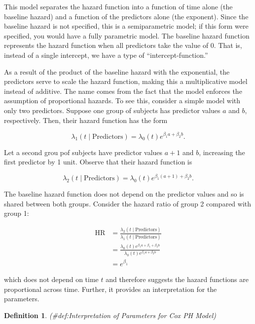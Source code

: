 \documentclass[
]{book}
\theoremstyle{plain}
\theoremstyle{mydefn}
\newtheorem{definition}{Definition}[chapter]
\theoremstyle{myexmpl}
\theoremstyle{remark}
\begin{document}
This model separates the hazard function into a function of time alone (the baseline hazard) and a function of the predictors alone (the exponent). Since the baseline hazard is not specified, this is a semiparametric model; if this form were specified, you would have a fully parametric model. The baseline hazard function represents the hazard function when all predictors take the value of 0. That is, instead of a single intercept, we have a type of ``intercept-function.''

As a result of the product of the baseline hazard with the exponential, the predictors serve to scale the hazard function, making this a multiplicative model instead of additive. The name comes from the fact that the model enforces the assumption of proportional hazards. To see this, consider a simple model with only two predictors. Suppose one group of subjects has predictor values \(a\) and \(b\), respectively. Then, their hazard function has the form

\[\lambda_1(t \mid \text{Predictors}) = \lambda_0(t) e^{\beta_1 a + \beta_2 b}.\]

Let a second grou pof subjects have predictor values \(a + 1\) and \(b\), increasing the first predictor by 1 unit. Observe that their hazard function is

\[\lambda_2(t \mid \text{Predictors}) = \lambda_0(t) e^{\beta_1 (a + 1) + \beta_2 b}.\]

The baseline hazard function does not depend on the predictor values and so is shared between both groups. Consider the hazard ratio of group 2 compared with group 1:

\[
\begin{aligned}
  \text{HR} &= \frac{\lambda_2(t \mid \text{Predictors})}{\lambda_1(t \mid \text{Predictors})} \\
    &= \frac{\lambda_0(t) e^{\beta_1 a + \beta_1 + \beta_2 b}}{\lambda_0(t) e^{\beta_1 a + \beta_2 b}} \\
    &= e^{\beta_1}
\end{aligned}
\]

which does not depend on time \(t\) and therefore suggests the hazard functions are proportional across time. Further, it provides an interpretation for the parameters.

\begin{definition}
\protect\hypertarget{def:Interpretationux20ofux20Parametersux20forux20Coxux20PHux20Model}{}{(\#def:Interpretation of Parameters for Cox PH Model) }
\end{definition}
\end{document}

